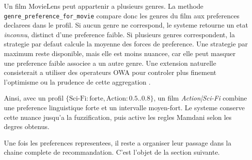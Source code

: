 Un film MovieLens peut appartenir a plusieurs genres. La methode \texttt{genre\_preference\_for\_movie} compare donc les genres du film aux preferences declarees dans le profil. Si aucun genre ne correspond, le systeme retourne un etat \emph{inconnu}, distinct d'une preference faible. Si plusieurs genres correspondent, la strategie par defaut calcule la moyenne des forces de preference. Une strategie par maximum reste disponible, mais elle est moins nuancee, car elle peut masquer une preference faible associee a un autre genre. Une extension naturelle consisterait a utiliser des operateurs OWA pour controler plus finement l'optimisme ou la prudence de cette aggregation \cite{yager1988}.

Ainsi, avec un profil $\{\text{Sci-Fi}: \text{forte}, \text{Action}: 0.5..0.8\}$, un film \emph{Action|Sci-Fi} combine une preference linguistique forte et un intervalle moyen-fort. Le systeme conserve cette nuance jusqu'a la fuzzification, puis active les regles Mamdani selon les degres obtenus.

Une fois les preferences representees, il reste a organiser leur passage dans la chaine complete de recommandation. C'est l'objet de la section suivante.
